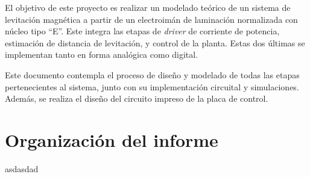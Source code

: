 \noindent El objetivo de este proyecto es realizar un modelado teórico de un sistema de levitación magnética a partir de un electroimán de laminación normalizada con núcleo tipo “E''. Este integra las etapas de \textsl{driver} de corriente de potencia, estimación de distancia de levitación, y control de la planta. Estas dos últimas se implementan tanto en forma analógica como digital.

\noindent Este documento contempla el proceso de diseño y modelado de todas las etapas pertenecientes al sistema, junto con su implementación circuital y simulaciones. Además, se realiza el diseño del circuito impreso de la placa de control.

\section{Organización del informe}

asdasdad
 